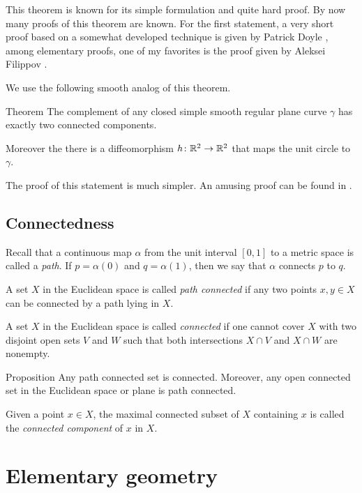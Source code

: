 This theorem is known for its simple formulation and quite hard proof.
By now many proofs of this theorem are known.
For the first statement, a very short proof based on a somewhat developed technique is given by Patrick Doyle \cite{doyle},
among elementary proofs, one of my favorites is the proof given by Aleksei Filippov \cite{filippov}.

We use the following smooth analog of this theorem.

\begin{thm}{Theorem}
The complement of any closed simple smooth regular plane curve $\gamma$ has exactly two connected components. 

Moreover the there is a diffeomorphism $h\colon\mathbb{R}^2\to \mathbb{R}^2$ that maps the unit circle to $\gamma$.
\end{thm}

The proof of this statement is much simpler.
An amusing proof can be found in \cite{chambers-liokumovich}.

\section{Connectedness}

Recall that a continuous map $\alpha$ from the unit interval $[0,1]$ to a metric space is called a \emph{path}. If $p=\alpha (0)$ and $q = \alpha (1)$, then we say that $\alpha$ connects $p$ to $q$.


A set $X$ in the Euclidean space is called \emph{path connected} if any two points $x,y\in X$ can be connected by a path lying in $X$.

A set $X$ in the Euclidean space is called \emph{connected} if one cannot cover $X$ with two disjoint open sets $V$ and $W$ such that both intersections $X\cap V$ and $X\cap W$ are nonempty.

\begin{thm}{Proposition}
Any path connected set is connected.
Moreover, any open connected set in the Euclidean space or  plane is path connected.
\end{thm}

Given a point $x\in X$, the maximal connected subset of $X$ containing $x$ is called the \emph{connected component} of $x$ in $X$.



\chapter{Elementary geometry}


